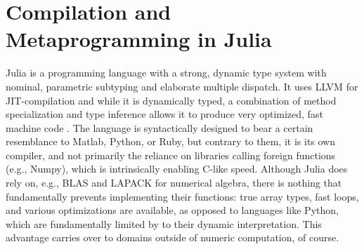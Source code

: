 \section{Compilation and Metaprogramming in Julia}
\label{sec:comp-metapr-julia}

Julia \parencite{bezanson2017julia} is a programming language with a strong, dynamic type system
with nominal, parametric subtyping and elaborate multiple dispatch.  It uses LLVM
\parencite{llvmproject2019llvm} for JIT-compilation and while it is dynamically typed, a combination
of method specialization and type inference allows it to produce very optimized, fast machine code
\parencite{bezanson2018julia}.  The language is syntactically designed to bear a certain resemblance
to Matlab, Python, or Ruby, but contrary to them, it is its own compiler, and not primarily the
reliance on libraries calling foreign functions (e.g., Numpy), which is intrinsically enabling
C-like speed.  Although Julia does rely on, e.g., BLAS and LAPACK for numerical algebra, there is
nothing that fundamentally prevents implementing their functions: true array types, fast loops, and
various optimizations are available, as opposed to languages like Python, which are fundamentally
limited by to their dynamic interpretation.  This advantage carries over to domains outside of
numeric computation, of course.


